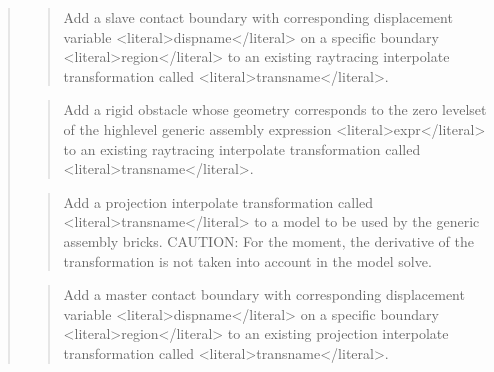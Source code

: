\documentclass[a4paper,11pt,english]{sphinxmanual}
\begin{document}
\begin{quote}
\begin{quote}
\sphinxAtStartPar
Add a slave contact boundary with corresponding displacement variable
\textless{}literal\textgreater{}dispname\textless{}/literal\textgreater{} on a specific boundary \textless{}literal\textgreater{}region\textless{}/literal\textgreater{} to an existing raytracing
interpolate transformation called \textless{}literal\textgreater{}transname\textless{}/literal\textgreater{}.
\end{quote}

\sphinxAtStartPar
{}
\begin{quote}

\sphinxAtStartPar
Add a rigid obstacle whose geometry corresponds to the zero level\sphinxhyphen{}set
of the high\sphinxhyphen{}level generic assembly expression \textless{}literal\textgreater{}expr\textless{}/literal\textgreater{}
to an existing raytracing interpolate transformation called \textless{}literal\textgreater{}transname\textless{}/literal\textgreater{}.
\end{quote}

\sphinxAtStartPar
{}
\begin{quote}

\sphinxAtStartPar
Add a projection interpolate transformation called \textless{}literal\textgreater{}transname\textless{}/literal\textgreater{} to a model
to be used by the generic assembly bricks.
CAUTION: For the moment, the derivative of the
transformation is not taken into account in the model solve.
\end{quote}

\sphinxAtStartPar
{}
\begin{quote}

\sphinxAtStartPar
Add a master contact boundary with corresponding displacement variable
\textless{}literal\textgreater{}dispname\textless{}/literal\textgreater{} on a specific boundary \textless{}literal\textgreater{}region\textless{}/literal\textgreater{} to an existing projection
interpolate transformation called \textless{}literal\textgreater{}transname\textless{}/literal\textgreater{}.
\end{quote}


\end{quote}
\end{document}
